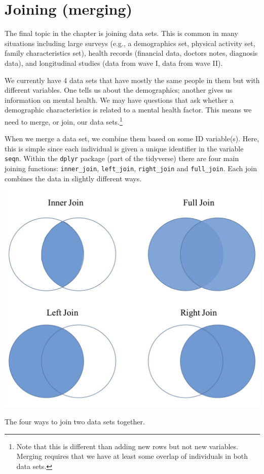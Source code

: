 \documentclass[]{tufte-book}
\theoremstyle{definition}
\theoremstyle{definition}
\theoremstyle{remark}
\begin{document}
\section*{Joining (merging)}\label{joining-merging}

The final topic in the chapter is joining data sets. This is common in
many situations including large surveys (e.g., a demographics set,
physical activity set, family characteristics set), health records
(financial data, doctors notes, diagnosis data), and longitudinal
studies (data from wave I, data from wave II).

We currently have 4 data sets that have mostly the same people in them
but with different variables. One tells us about the demographics;
another gives us information on mental health. We may have questions
that ask whether a demographic characteristics is related to a mental
health factor. This means we need to merge, or join, our data
sets.\footnote{Note that this is different than adding new rows but not
  new variables. Merging requires that we have at least some overlap of
  individuals in both data sets.}

When we merge a data set, we combine them based on some ID variable(s).
Here, this is simple since each individual is given a unique identifier
in the variable \texttt{seqn}. Within the \texttt{dplyr} package (part
of the tidyverse) there are four main joining functions:
\texttt{inner\_join}, \texttt{left\_join}, \texttt{right\_join} and
\texttt{full\_join}. Each join combines the data in slightly different
ways.

\includegraphics{Joining.jpg}
\caption{The four ways to join two data sets together.}
\end{document}
